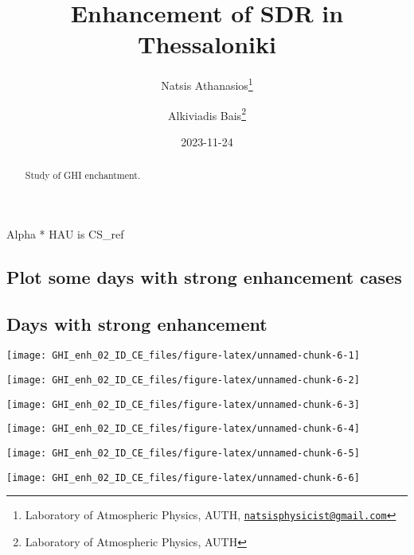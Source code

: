 \documentclass[
  10pt,
  a4paper,oneside]{article}
\title{Enhancement of SDR in Thessaloniki}
\author{Natsis Athanasios\footnote{Laboratory of Atmospheric Physics, AUTH, \href{mailto:natsisphysicist@gmail.com}{\nolinkurl{natsisphysicist@gmail.com}}} \and Alkiviadis Bais\footnote{Laboratory of Atmospheric Physics, AUTH}}
\date{2023-11-24}
\begin{document}
\maketitle
\begin{abstract}
Study of GHI enchantment.
\end{abstract}

{
\hypersetup{linkcolor=}
\setcounter{tocdepth}{4}
\tableofcontents
}
Alpha * HAU is CS\_ref

\hypertarget{plot-some-days-with-strong-enhancement-cases}{%
\subsection{Plot some days with strong enhancement cases}\label{plot-some-days-with-strong-enhancement-cases}}

\hypertarget{days-with-strong-enhancement}{%
\subsection{Days with strong enhancement}\label{days-with-strong-enhancement}}

\begin{center}\texttt{[image: GHI\_enh\_02\_ID\_CE\_files/figure-latex/unnamed-chunk-6-1]} \end{center}

\begin{center}\texttt{[image: GHI\_enh\_02\_ID\_CE\_files/figure-latex/unnamed-chunk-6-2]} \end{center}

\begin{center}\texttt{[image: GHI\_enh\_02\_ID\_CE\_files/figure-latex/unnamed-chunk-6-3]} \end{center}

\begin{center}\texttt{[image: GHI\_enh\_02\_ID\_CE\_files/figure-latex/unnamed-chunk-6-4]} \end{center}

\begin{center}\texttt{[image: GHI\_enh\_02\_ID\_CE\_files/figure-latex/unnamed-chunk-6-5]} \end{center}

\begin{center}\texttt{[image: GHI\_enh\_02\_ID\_CE\_files/figure-latex/unnamed-chunk-6-6]} \end{center}
\end{document}
